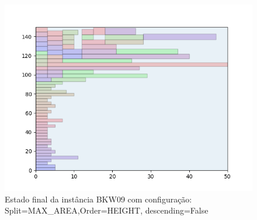 \begin{figure}[H]
    \centering
    \caption[]{Estado final da instância BKW09 com configuração: Split=MAX_AREA,Order=HEIGHT, descending=False}
    \label{fig:bkw09-max_area-height-false}
    \includegraphics[scale=0.5]{output/figures/bkw/bkw09/max_area/height/false/000}
\end{figure}